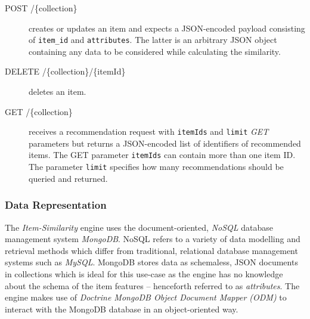 \begin{description}
    \item[POST /\{collection\}] creates or updates an item and expects a JSON-encoded payload consisting of \texttt{item_id} and \texttt{attributes}. The latter is an arbitrary JSON object containing any data to be considered while calculating the similarity.
    \item[DELETE /\{collection\}/\{itemId\}] deletes an item.
    \item[GET /\{collection\}] receives a recommendation request with \texttt{itemIds} and \texttt{limit} \emph{GET} parameters but returns a JSON-encoded list of identifiers of recommended items. The GET parameter \texttt{itemIds} can contain more than one item ID. The parameter \texttt{limit} specifies how many recommendations should be queried and returned.
\end{description}

\subsubsection{Data Representation}

The \emph{Item-Similarity} engine uses the document-oriented, \emph{NoSQL} database management system \emph{MongoDB}. NoSQL refers to a variety of data modelling and retrieval methods which differ from traditional, relational database management systems such as \emph{MySQL}. MongoDB stores data as schemaless, JSON documents in collections which is ideal for this use-case as the engine has no knowledge about the schema of the item features -- henceforth referred to as \emph{attributes}. The engine makes use of \emph{Doctrine MongoDB Object Document Mapper (ODM)} to interact with the MongoDB database in an object-oriented way.

